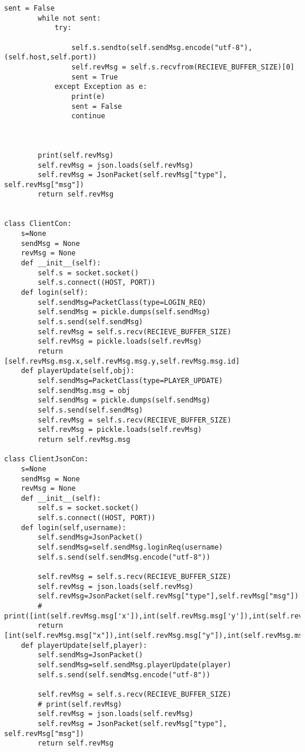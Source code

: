 \begin{lstlisting}[style=pythonstyle, caption=client communication classes]
        sent = False
        while not sent:
            try:

                self.s.sendto(self.sendMsg.encode("utf-8"),(self.host,self.port))
                self.revMsg = self.s.recvfrom(RECIEVE_BUFFER_SIZE)[0]
                sent = True
            except Exception as e:
                print(e)
                sent = False
                continue
        


        print(self.revMsg)
        self.revMsg = json.loads(self.revMsg)
        self.revMsg = JsonPacket(self.revMsg["type"], self.revMsg["msg"])
        return self.revMsg


class ClientCon:
    s=None
    sendMsg = None
    revMsg = None
    def __init__(self):
        self.s = socket.socket()
        self.s.connect((HOST, PORT))
    def login(self):
        self.sendMsg=PacketClass(type=LOGIN_REQ)
        self.sendMsg = pickle.dumps(self.sendMsg)
        self.s.send(self.sendMsg)
        self.revMsg = self.s.recv(RECIEVE_BUFFER_SIZE)
        self.revMsg = pickle.loads(self.revMsg)
        return [self.revMsg.msg.x,self.revMsg.msg.y,self.revMsg.msg.id]
    def playerUpdate(self,obj):
        self.sendMsg=PacketClass(type=PLAYER_UPDATE)
        self.sendMsg.msg = obj
        self.sendMsg = pickle.dumps(self.sendMsg)
        self.s.send(self.sendMsg)
        self.revMsg = self.s.recv(RECIEVE_BUFFER_SIZE)
        self.revMsg = pickle.loads(self.revMsg)
        return self.revMsg.msg

class ClientJsonCon:
    s=None
    sendMsg = None
    revMsg = None
    def __init__(self):
        self.s = socket.socket()
        self.s.connect((HOST, PORT))
    def login(self,username):
        self.sendMsg=JsonPacket()
        self.sendMsg=self.sendMsg.loginReq(username)
        self.s.send(self.sendMsg.encode("utf-8"))

        self.revMsg = self.s.recv(RECIEVE_BUFFER_SIZE)
        self.revMsg = json.loads(self.revMsg)
        self.revMsg=JsonPacket(self.revMsg["type"],self.revMsg["msg"])
        # print([int(self.revMsg.msg['x']),int(self.revMsg.msg['y']),int(self.revMsg.msg['id'])])
        return [int(self.revMsg.msg["x"]),int(self.revMsg.msg["y"]),int(self.revMsg.msg["id"])]
    def playerUpdate(self,player):
        self.sendMsg=JsonPacket()
        self.sendMsg=self.sendMsg.playerUpdate(player)
        self.s.send(self.sendMsg.encode("utf-8"))

        self.revMsg = self.s.recv(RECIEVE_BUFFER_SIZE)
        # print(self.revMsg)
        self.revMsg = json.loads(self.revMsg)
        self.revMsg = JsonPacket(self.revMsg["type"], self.revMsg["msg"])
        return self.revMsg

        

        \end{lstlisting}
